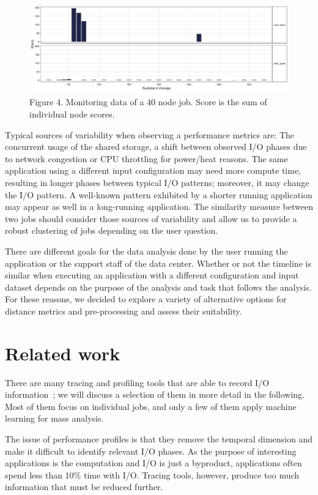 \documentclass[]{llncs}
\begin{document}
\begin{figure}
	\centering
	 \includegraphics[width=4.61in,height=1.54in]{./media/image25.png}
	 \caption{Figure 4. Monitoring data of a 40 node job. Score is the sum of individual node scores.}
	 \label{fig:typ_io:3}
\end{figure}

Typical sources of variability when observing a performance metrics are: The concurrent usage of the shared storage, a shift between observed I/O phases due to network congestion or CPU throttling for power/heat reasons.
The same application using a different input configuration may need more compute time, resulting in longer phases between typical I/O patterns; moreover, it may change the I/O pattern.
A well-known pattern exhibited by a shorter running application may appear as well in a long-running application.
The similarity measure between two jobs should consider those sources of variability and allow us to provide a robust clustering of jobs depending on the user question.

There are different goals for the data analysis done by the user running the application or the support staff of the data center.
Whether or not the timeline is similar when executing an application with a different configuration and input dataset depends on the purpose of the analysis and task that follows the analysis.
For these reasons, we decided to explore a variety of alternative options for distance metrics and pre-processing and assess their suitability.


\section{Related work}
There are many tracing and profiling tools that are able to record I/O information~\cite{TFAPIKBBCF19}; we will discuss a selection of them in more detail in the following.
Most of them focus on individual jobs, and only a few of them apply machine learning for mass analysis.

The issue of performance profiles is that they remove the temporal dimension and make it difficult to identify relevant I/O phases.
As the purpose of interesting applications is the computation and I/O is just a byproduct, applications often spend less than 10\% time with I/O.
Tracing tools, however, produce too much information that must be reduced further.
\end{document}
